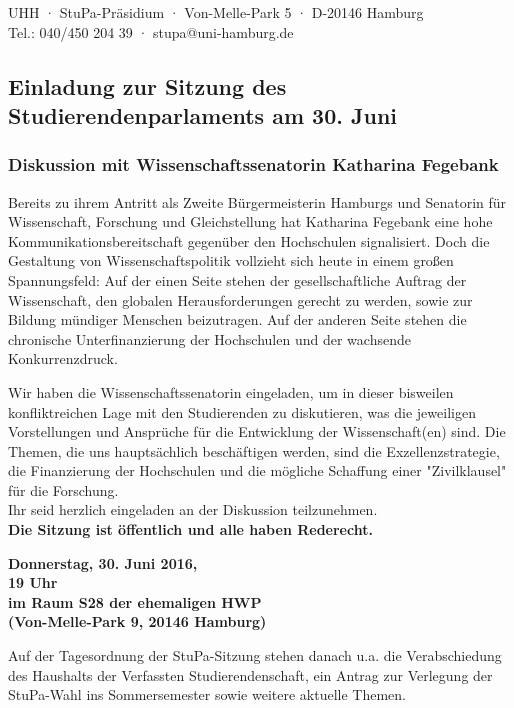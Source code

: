 \documentclass[a5paper,ngerman,headheight=80pt,10pt,DIV=calc]{scrartcl}
\begin{document}
    UHH · StuPa-Präsidium · Von-Melle-Park 5 · D-20146 Hamburg\\
    Tel.: 040/450 204 39 · stupa@uni-hamburg.de

    \subsection*{Einladung zur Sitzung des Studierendenparlaments am 30. Juni}
    \subsubsection*{Diskussion mit Wissenschaftssenatorin Katharina Fegebank}

    Bereits zu ihrem Antritt als Zweite Bürgermeisterin Hamburgs und Senatorin
    für Wissenschaft, Forschung und Gleichstellung hat Katharina Fegebank eine
    hohe Kommunikationsbereitschaft gegenüber den Hochschulen signalisiert. Doch
    die Gestaltung von Wissenschaftspolitik vollzieht sich heute in einem
    großen Spannungsfeld: Auf der einen Seite stehen der gesellschaftliche
    Auftrag der Wissenschaft, den globalen Herausforderungen gerecht zu werden,
    sowie zur Bildung mündiger Menschen beizutragen. Auf der anderen Seite stehen
    die chronische Unterfinanzierung der Hochschulen und der wachsende
    Konkurrenzdruck.

    Wir haben die Wissenschaftssenatorin eingeladen, um in dieser bisweilen
    konfliktreichen Lage mit den Studierenden zu diskutieren, was die jeweiligen
    Vorstellungen und Ansprüche für die Entwicklung der Wissenschaft(en) sind.
    Die Themen, die uns hauptsächlich beschäftigen werden, sind die
    Exzellenzstrategie, die Finanzierung der Hochschulen und die mögliche Schaffung
    einer "Zivilklausel" für die Forschung.\\

    Ihr seid herzlich eingeladen an der Diskussion teilzunehmen.\\
    \textbf{Die Sitzung ist öffentlich und alle haben Rederecht.}

    \begin{center}
        \textbf{
        Donnerstag, 30. Juni 2016,\\
        19 Uhr\\
        im Raum S28 der ehemaligen HWP\\
        (Von-Melle-Park 9, 20146 Hamburg)}
    \end{center}
    Auf der Tagesordnung der StuPa-Sitzung stehen danach u.a. die Verabschiedung
    des Haushalts der Verfassten Studierendenschaft, ein Antrag zur Verlegung
    der StuPa-Wahl ins Sommersemester sowie weitere aktuelle Themen.
\end{document}
